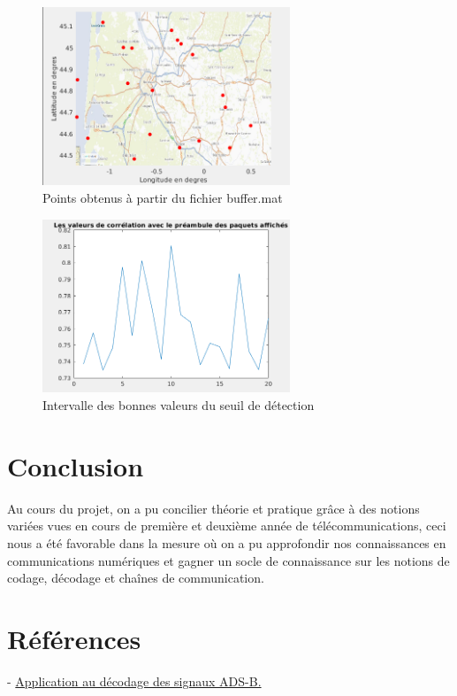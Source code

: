 \documentclass{rapport}
\begin{document}
{\begin{figure}[H]
    \centering
    \includegraphics[width=0.66\textwidth]{logos/tache_8_2_map.png}
    \caption{Points obtenus à partir du fichier buffer.mat}
    \label{pb_teb}
\end{figure}

\begin{figure}[H]
    \centering
    \includegraphics[width=0.66\textwidth]{logos/tache_8_2_corr_val.png}
    \caption{Intervalle des bonnes valeurs du seuil de détection}
    \label{pb_teb}
\end{figure}






\newpage
\section{\Large Conclusion}
Au cours du projet, on a pu concilier théorie et pratique grâce à des notions variées vues en cours de première et deuxième année de télécommunications, ceci nous a été favorable dans la mesure où on a pu approfondir nos connaissances en communications numériques et gagner un socle de connaissance sur les notions de codage, décodage et chaînes de communication.


\section{\Large Références}
- \href{https://gnuradio-fr-18.sciencesconf.org/data/pages/ADSB_TP.pdf}{Application au décodage des signaux ADS-B.}
\vspace{7}

}
\end{document}
